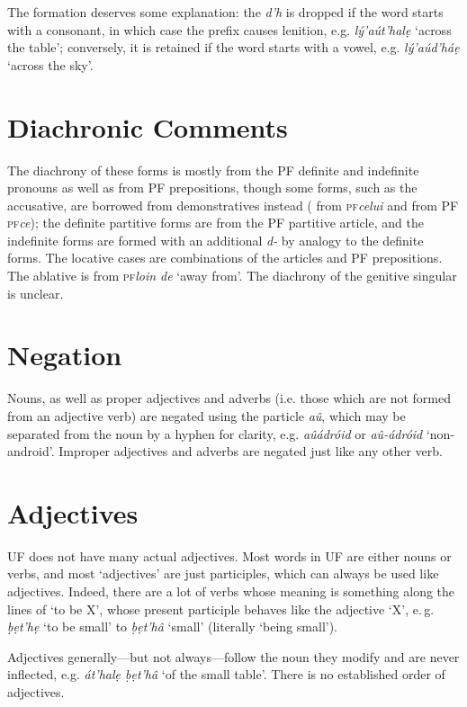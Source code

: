 \documentclass[a4paper, 12pt, twoside, openright, final]{book}
\def\pfabbr{{\normalfont\scshape pf\space}}
\def\pf#1{\pfabbr\textit{#1}}
\let \w \textit
\begin{document}
The formation  deserves some explanation: the \w{d’h} is dropped if the word starts with a consonant, in
which case the prefix causes lenition, e.g. \w{lý’aút’halẹ} ‘across the table’; conversely, it is retained if the word
starts with a vowel, e.g. \w{lý’aúd’háẹ} ‘across the sky’.



\section{Diachronic Comments}
The diachrony of these forms is mostly from the PF definite and indefinite pronouns as well as from PF prepositions, though
some forms, such as the
accusative, are borrowed from demonstratives instead ( from \pf{celui} and  from PF \pf{ce}); the definite
partitive forms are from the PF partitive article, and
the indefinite forms are formed with an additional \w{d-} by analogy to the definite forms. The locative cases are combinations
of the articles and PF prepositions. The ablative is from \pf{loin de} ‘away from’. The diachrony of the genitive singular
is unclear.

\section{Negation}\label{subsubsec:noun-negation}
Nouns, as well as proper adjectives and adverbs (i.e. those which are not formed from an adjective verb) are negated
using the particle \w{aû}, which may be separated from the noun by a hyphen for clarity, e.g. \w{aûádróid} or \w{aû-ádróid}
‘non-android’. Improper adjectives and adverbs are negated just like any other verb.

\section{Adjectives}
UF does not have many actual adjectives. Most words in UF are either nouns or verbs, and most ‘adjectives’ are just
participles, which can always be used like adjectives. Indeed, there are a lot of verbs whose meaning is something
along the lines of ‘to be X’, whose present participle behaves like the adjective ‘X’, e.\,g. \w{ḅẹt’hẹ} ‘to be small’
to \w{ḅẹt’hâ} ‘small’ (literally ‘being small’).

Adjectives generally—but not always—follow the noun they modify and are never inflected, e.g. \w{át’halẹ ḅẹt’hâ} ‘of the small table’.
There is no established order of adjectives.
\end{document}
